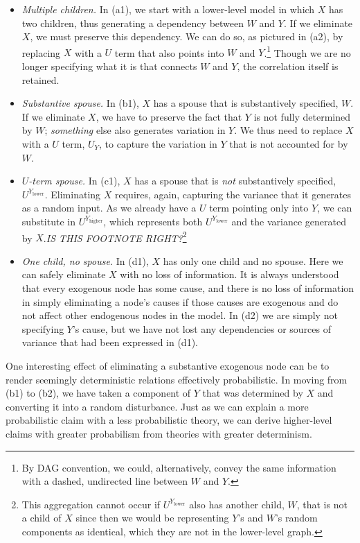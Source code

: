 \documentclass[12pt,]{book}
\providecommand{\tightlist}{%
  \setlength{\itemsep}{0pt}\setlength{\parskip}{0pt}}
\let\rmarkdownfootnote\footnote%
\def\footnote{\protect\rmarkdownfootnote}
\begin{document}
\begin{itemize}
\tightlist
\item
  \emph{Multiple children.} In (a1), we start with a lower-level model in which \(X\) has two children, thus generating a dependency between \(W\) and \(Y\). If we eliminate \(X\), we must preserve this dependency. We can do so, as pictured in (a2), by replacing \(X\) with a \(U\) term that also points into \(W\) and \(Y\).\footnote{By DAG convention, we could, alternatively, convey the same information with a dashed, undirected line between \(W\) and \(Y\).} Though we are no longer specifying what it is that connects \(W\) and \(Y\), the correlation itself is retained.
\item
  \emph{Substantive spouse.} In (b1), \(X\) has a spouse that is substantively specified, \(W\). If we eliminate \(X\), we have to preserve the fact that \(Y\) is not fully determined by \(W\); \emph{something} else also generates variation in \(Y\). We thus need to replace \(X\) with a \(U\) term, \(U_Y\), to capture the variation in \(Y\) that is not accounted for by \(W\).
\item
  \emph{\(U\)-term spouse.} In (c1), \(X\) has a spouse that is \emph{not} substantively specified, \(U^{Y_\text{lower}}\). Eliminating \(X\) requires, again, capturing the variance that it generates as a random input. As we already have a \(U\) term pointing only into \(Y\), we can substitute in \(U^{Y_\text{higher}}\), which represents both \(U^{Y_\text{lower}}\) and the variance generated by \(X\).\emph{IS THIS FOOTNOTE RIGHT?}\footnote{This aggregation cannot occur if \(U^{Y_\text{lower}}\) also has another child, \(W\), that is not a child of \(X\) since then we would be representing \(Y\)'s and \(W\)'s random components as identical, which they are not in the lower-level graph.}
\item
  \emph{One child, no spouse.} In (d1), \(X\) has only one child and no spouse. Here we can safely eliminate \(X\) with no loss of information. It is always understood that every exogenous node has some cause, and there is no loss of information in simply eliminating a node's causes if those causes are exogenous and do not affect other endogenous nodes in the model. In (d2) we are simply not specifying \(Y\)'s cause, but we have not lost any dependencies or sources of variance that had been expressed in (d1).
\end{itemize}

One interesting effect of eliminating a substantive exogenous node can be to render seemingly deterministic relations effectively probabilistic. In moving from (b1) to (b2), we have taken a component of \(Y\) that was determined by \(X\) and converting it into a random disturbance. Just as we can explain a more probabilistic claim with a less probabilistic theory, we can derive higher-level claims with greater probabilism from theories with greater determinism.
\end{document}
